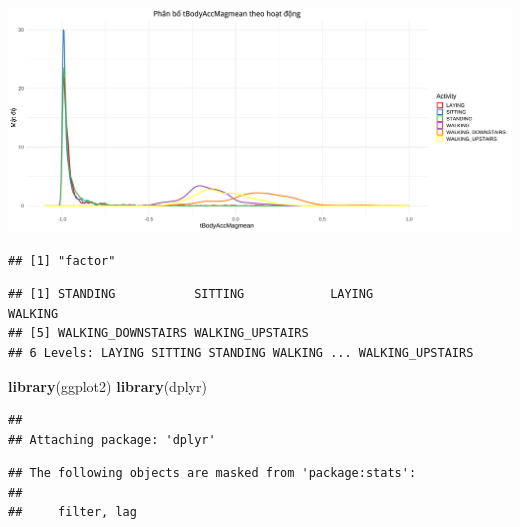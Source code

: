\documentclass[
]{article}
\newenvironment{Shaded}{\begin{snugshade}}{\end{snugshade}}
\newcommand{\FunctionTok}[1]{\textcolor[rgb]{0.13,0.29,0.53}{\textbf{#1}}}
\newcommand{\NormalTok}[1]{#1}
\newcommand{\SpecialCharTok}[1]{\textcolor[rgb]{0.81,0.36,0.00}{\textbf{#1}}}
\begin{document}
\includegraphics{report_files/figure-latex/unnamed-chunk-13-1.pdf}

\begin{Shaded}
\end{Shaded}

\begin{verbatim}
## [1] "factor"
\end{verbatim}

\begin{Shaded}
\end{Shaded}

\begin{verbatim}
## [1] STANDING           SITTING            LAYING             WALKING           
## [5] WALKING_DOWNSTAIRS WALKING_UPSTAIRS  
## 6 Levels: LAYING SITTING STANDING WALKING ... WALKING_UPSTAIRS
\end{verbatim}

\begin{Shaded}
\begin{Highlighting}[]
\FunctionTok{library}\NormalTok{(ggplot2)}
\FunctionTok{library}\NormalTok{(dplyr)}
\end{Highlighting}
\end{Shaded}

\begin{verbatim}
## 
## Attaching package: 'dplyr'
\end{verbatim}

\begin{verbatim}
## The following objects are masked from 'package:stats':
## 
##     filter, lag
\end{verbatim}
\end{document}
